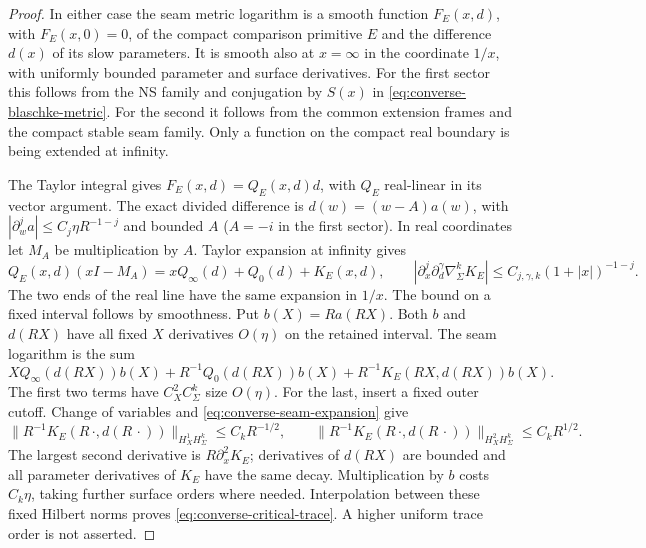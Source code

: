 \documentclass[11pt]{amsart}
\theoremstyle{definition}
\theoremstyle{remark}
\theoremstyle{plain}
\begin{document}
\begin{proof}
In either case the seam metric logarithm is a smooth function
$F_E(x,d)$, with $F_E(x,0)=0$, of the compact comparison primitive
$E$ and the difference $d(x)$ of its slow parameters.
It is smooth also at $x=\infty$ in the coordinate $1/x$,
with uniformly bounded parameter and surface derivatives.
For the first sector this follows from the NS family and
conjugation by $S(x)$ in \eqref{eq:converse-blaschke-metric}.
For the second it follows from the common extension frames and
the compact stable seam family. Only a function on the compact
real boundary is being extended at infinity.

The Taylor integral gives $F_E(x,d)=Q_E(x,d)d$, with $Q_E$
real-linear in its vector argument. The exact divided difference
is $d(w)=(w-A)a(w)$, with
$|\partial_w^ja|\leq C_j\eta R^{-1-j}$ and bounded $A$
($A=-i$ in the first sector). In real coordinates let $M_A$
be multiplication by $A$. Taylor expansion at infinity gives
\begin{equation}\label{eq:converse-seam-expansion}
 Q_E(x,d)(xI-M_A)
       =xQ_\infty(d)+Q_0(d)+K_E(x,d),\qquad
 |\partial_x^j\partial_d^\gamma\nabla_\Sigma^kK_E|
                    \leq C_{j,\gamma,k}(1+|x|)^{-1-j}.
\end{equation}
The two ends of the real line have the same expansion in $1/x$.
The bound on a fixed interval follows by smoothness.
Put $b(X)=Ra(RX)$. Both $b$ and $d(RX)$ have all fixed
$X$ derivatives $O(\eta)$ on the retained interval. The seam
logarithm is the sum
\[
 XQ_\infty(d(RX))b(X)+R^{-1}Q_0(d(RX))b(X)
                   +R^{-1}K_E(RX,d(RX))b(X).
\]
The first two terms have $C_X^2C_\Sigma^k$ size $O(\eta)$.
For the last, insert a fixed outer cutoff. Change of variables
and \eqref{eq:converse-seam-expansion} give
\[
 \|R^{-1}K_E(R\,\cdot,d(R\,\cdot))\|_{H_X^1H_\Sigma^k}
       \leq C_kR^{-1/2},\qquad
 \|R^{-1}K_E(R\,\cdot,d(R\,\cdot))\|_{H_X^2H_\Sigma^k}
       \leq C_kR^{1/2}.
\]
The largest second derivative is $R\partial_x^2K_E$;
derivatives of $d(RX)$ are bounded and all parameter derivatives
of $K_E$ have the same decay. Multiplication by $b$ costs
$C_k\eta$, taking further surface orders where needed.
Interpolation between these fixed Hilbert norms proves
\eqref{eq:converse-critical-trace}. A higher uniform trace
order is not asserted.


\end{proof}
\end{document}
